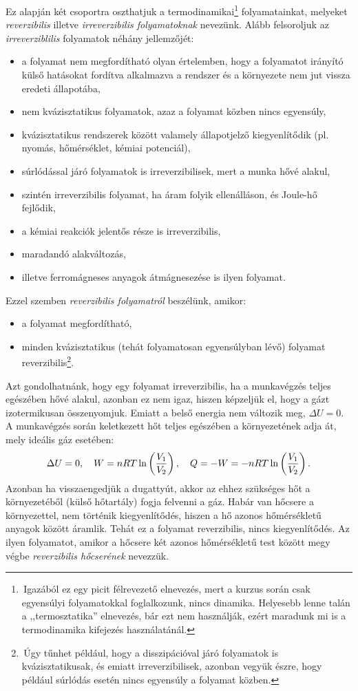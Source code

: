Ez alapján két csoportra oszthatjuk a termodinamikai\footnote{\,Igazából ez egy picit félrevezető elnevezés, mert a kurzus során csak egyensúlyi folyamatokkal foglalkozunk, nincs dinamika. Helyesebb lenne talán a ,,termosztatika'' elnevezés, bár ezt nem használják, ezért maradunk mi is a termodinamika kifejezés használatánál.} folyamatainkat, melyeket \emph{reverzibilis} illetve \emph{irreverzibilis folyamatoknak} nevezünk. Alább felsoroljuk az \emph{irreverziblilis} folyamatok néhány jellemzőjét:
\begin{itemize}
    \item a folyamat nem megfordítható olyan értelemben, hogy a folyamatot irányító külső hatásokat fordítva alkalmazva a rendszer és a környezete nem jut vissza eredeti állapotába,
    \item nem kvázisztatikus folyamatok, azaz a folyamat közben nincs egyensúly,
    \item kvázisztatikus rendszerek között valamely állapotjelző kiegyenlítődik (pl. nyomás, hőmérséklet, kémiai potenciál),
    \item súrlódással járó folyamatok is irreverzibilisek, mert a munka hővé alakul,
    \item szintén irreverzibilis folyamat, ha áram folyik ellenálláson, és Joule-hő fejlődik,
    \item a kémiai reakciók jelentős része is irreverzibilis,
    \item maradandó alakváltozás,
    \item illetve ferromágneses anyagok átmágnesezése is ilyen folyamat.
\end{itemize}
Ezzel szemben \emph{reverzibilis folyamatról} beszélünk, amikor:
\begin{itemize}
    \item a folyamat megfordítható,
    \item minden kvázisztatikus (tehát folyamatosan egyensúlyban lévő) folyamat reverzibilis\footnote{\,Úgy tűnhet például, hogy a disszipációval járó folyamatok is kvázisztatikusak, és emiatt irreverzibilisek, azonban vegyük észre, hogy például  súrlódás esetén nincs egyensúly a folyamat közben.}.
\end{itemize}
Azt gondolhatnánk, hogy egy folyamat irreverzibilis, ha a munkavégzés teljes egészében hővé alakul, azonban ez nem igaz, hiszen képzeljük el, hogy a gázt izotermikusan összenyomjuk. Emiatt a belső energia nem változik meg, $\Delta U =0$. A munkavégzés során keletkezett hőt teljes egészében a környezetének adja át, mely ideális gáz esetében:
\begin{align}
    \Delta U =0,\quad W = nRT\ln\left({\frac{V_1}{V_2}}\right),\quad Q = -W = - nRT\ln\left({\frac{V_1}{V_2}}\right).
\end{align}
Azonban ha visszaengedjük a dugattyút, akkor az ehhez szükséges hőt a környezetéből (külső hőtartály) fogja felvenni a gáz. Habár van hőcsere a környezettel, nem történik kiegyenlítődés, hiszen a hő azonos hőmérsékletű anyagok között áramlik. Tehát ez a folyamat reverzibilis, nincs kiegyenlítődés. Az ilyen folyamatot, amikor a hőcsere két azonos hőmérsékletű test között megy végbe \emph{reverzibilis hőcserének} nevezzük.

